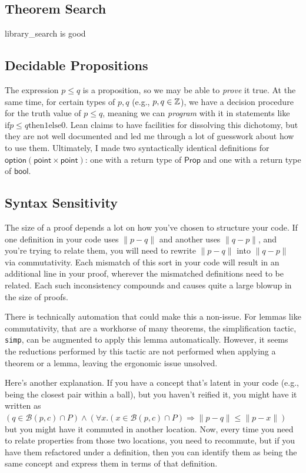 \documentclass{article}
\begin{document}
\subsection{Theorem Search}
library\_search is good

\subsection{Decidable Propositions}
The expression $p \leq q$ is a proposition, so we may be able to \textit{prove} it true.
At the same time, for certain types of $p, q$ (e.g., $p, q \in \mathbb{Z}$), we have a decision procedure for the truth value of $p \leq q$, meaning we can \textit{program} with it in statements like $\text{if} p \leq q \text{then} 1 \text{else} 0$.
Lean claims to have facilities for dissolving this dichotomy, but they are not well documented and led me through a lot of guesswork about how to use them.
Ultimately, I made two syntactically identical definitions for $\mathsf{option} (\mathsf{point} \times \mathsf{point})$: one with a return type of $\mathsf{Prop}$ and one with a return type of $\mathsf{bool}$.

\subsection{Syntax Sensitivity}
The size of a proof depends a lot on how you've chosen to structure your code.
If one definition in your code uses $\| p - q \|$ and another uses $\| q - p \|$, and you're trying to relate them, you will need to rewrite $\| p - q \|$ into $\| q - p \|$ via commutativity.
Each mismatch of this sort in your code will result in an additional line in your proof, wherever the mismatched definitions need to be related.
Each such inconsistency compounds and causes quite a large blowup in the size of proofs.

There is technically automation that could make this a non-issue.
For lemmas like commutativity, that are a workhorse of many theorems, the simplification tactic, \texttt{simp}, can be augmented to apply this lemma automatically.
However, it seems the reductions performed by this tactic are not performed when applying a theorem or a lemma, leaving the ergonomic issue unsolved.

Here's another explanation.
If you have a concept that's latent in your code (e.g., being the closest pair within a ball), but you haven't reified it, you might have it written as $(q \in \mathcal{B}(p, c) \cap P) \wedge (\forall x. (x \in \mathcal{B}(p, c) \cap P) \Rightarrow \| p - q \| \leq \| p - x \|)$ but you might have it commuted in another location.
Now, every time you need to relate properties from those two locations, you need to recommute, but if you have them refactored under a definition, then you can identify them as being the same concept and express them in terms of that definition.
\end{document}
